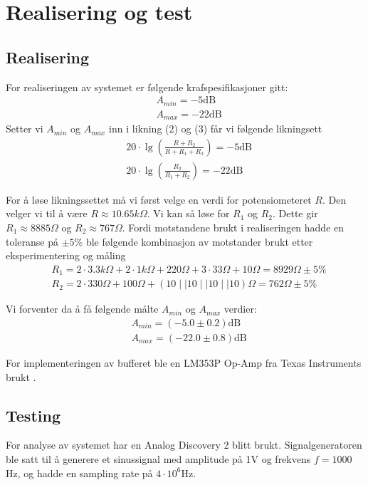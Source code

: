 \section{Realisering og test}
\label{realiseringOgTest}

\subsection{Realisering}
For realiseringen av systemet er følgende krafspesifikasjoner gitt:
\begin{align*}
    &A_{min} = -5\text{dB} \\
    &A_{max} = -22\text{dB}
\end{align*}
Setter vi $A_{min}$ og $A_{max}$ inn i likning (2) og (3) får vi følgende likningsett
\begin{align}
    &20 \cdot \lg{\left(\frac{R + R_2}{R + R_1 + R_2}\right)} = -5 \text{dB} \label{eq:eq1} \tag{I} \\
    &20 \cdot \lg{\left(\frac{R_2}{R_1 + R_2}\right)} = -22 \text{dB} \label{eq:eq2} \tag{II}
\end{align}

For å løse likningssettet må vi først velge en verdi for potensiometeret $R$.
Den velger vi til å være $R \approx 10.65k\Omega$.
Vi kan så løse for $R_1$ og $R_2$. Dette gir $R_1 \approx 8885\Omega$ og $R_2 \approx 767\Omega$. Fordi motstandene brukt i realiseringen 
hadde en toleranse på $\pm 5$\% ble følgende kombinasjon av motstander brukt etter eksperimentering og måling
\begin{align*}
    &R_1 = 2 \cdot 3.3k\Omega + 2 \cdot 1k\Omega + 220\Omega + 3 \cdot 33\Omega + 10\Omega = 8929\Omega \pm 5\% \\
    &R_2 = 2 \cdot 330\Omega + 100\Omega + \left(10 \mid\mid 10 \mid\mid 10 \mid\mid 10\right)\Omega = 762\Omega \pm 5\%
\end{align*}

Vi forventer da å få følgende målte $A_{min}$ og $A_{max}$ verdier:
\begin{align*}
    &A_{min} = (-5.0 \pm 0.2) \text{dB} \\
    &A_{max} = (-22.0 \pm 0.8) \text{dB} 
\end{align*}

For implementeringen av bufferet ble en LM353P Op-Amp fra Texas Instruments brukt \cite{lf353_opamp}.

\subsection{Testing}
For analyse av systemet har en Analog Discovery 2 \cite{discovery} blitt brukt. 
Signalgeneratoren ble satt til å generere et sinussignal med amplitude på 1V og 
frekvens $f = 1000$Hz, og hadde en sampling rate på $4 \cdot 10^6$Hz.

